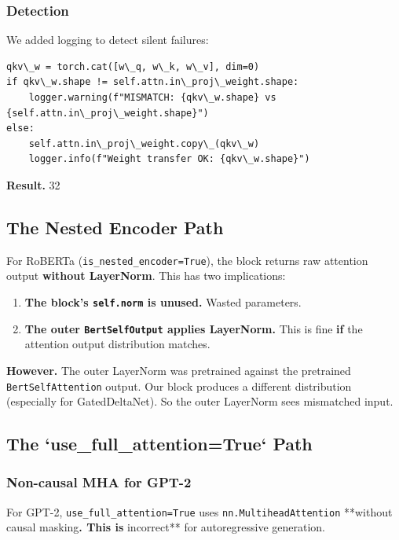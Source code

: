 \subsubsection{Detection}

We added logging to detect silent failures:

\begin{lstlisting}
qkv\_w = torch.cat([w\_q, w\_k, w\_v], dim=0)
if qkv\_w.shape != self.attn.in\_proj\_weight.shape:
    logger.warning(f"MISMATCH: {qkv\_w.shape} vs {self.attn.in\_proj\_weight.shape}")
else:
    self.attn.in\_proj\_weight.copy\_(qkv\_w)
    logger.info(f"Weight transfer OK: {qkv\_w.shape}")
\end{lstlisting}

\textbf{Result.} 32

\subsection{The Nested Encoder Path}

For RoBERTa (\texttt{is\_nested\_encoder=True}), the block returns raw attention 
output \textbf{without LayerNorm}. This has two implications:

\begin{enumerate}
\item \textbf{The block's \texttt{self.norm} is unused.} Wasted parameters.
\item \textbf{The outer \texttt{BertSelfOutput} applies LayerNorm.} This is fine \textbf{if}
  the attention output distribution matches.

\end{enumerate}
\textbf{However.} The outer LayerNorm was pretrained against the pretrained 
\texttt{BertSelfAttention} output. Our block produces a different distribution 
(especially for GatedDeltaNet). So the outer LayerNorm sees mismatched input.

\subsection{The `use\_full\_attention=True` Path}

\subsubsection{Non-causal MHA for GPT-2}

For GPT-2, \texttt{use\_full\_attention=True} uses \texttt{nn.MultiheadAttention} **without 
causal masking\textbf{. This is }incorrect** for autoregressive generation.

